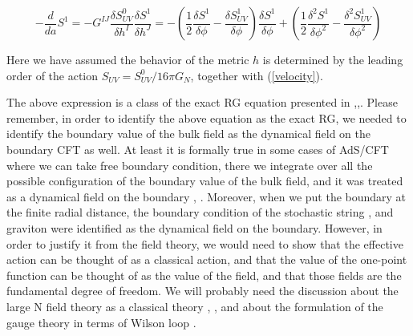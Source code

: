 \documentclass[12pt,epsbox]{article}
\numberwithin{equation}{section}
\begin{document}
\begin{equation}
-\frac{d}{da} S^1 = - G^{IJ} \frac{\delta S^0_{UV}}{\delta h^I} \frac{\delta S^1}{\delta h^J}
=-\left( \frac{1}{2} \frac{\delta S^1}{\delta \phi} -\frac{\delta S^1_{UV}}{\delta \phi}  \right) \frac{\delta S^1}{\delta \phi}
 + \left( \frac{1}{2} \frac{\delta^2 S^1}{\delta \phi^2} -\frac{\delta^2 S^1_{UV} }{\delta \phi^2} \right)\label{HERG1}
\end{equation}

Here we have assumed the behavior of the metric $h$ is determined by the leading order of the action $S_{UV}=S^0_{UV} / 16\pi G_N$, together with (\ref{velocity}).

The above expression is a class of the exact RG equation presented in \cite{Morris},\cite{Morris2},\cite{Oliver}. Please remember, in order to identify the above equation as the exact RG, we needed to identify the boundary value of the bulk field as the dynamical field on the boundary CFT as well. At least it is formally true in some cases of AdS/CFT where we can take free boundary condition, there we integrate over all the possible configuration of the boundary value of the bulk field, and it was treated as a dynamical field on the boundary \cite{MukundHRG}, \cite{WittenNeumann}. Moreover, when we put the boundary at the finite radial distance, the boundary condition of the stochastic string \cite{StochasticSon}, \cite{StochasticdeBoer} and graviton \cite{VV} were identified as the dynamical field on the boundary. However, in order to justify it from the field theory, we would need to show that the effective action can be thought of as a classical action, and that the value of the one-point function can be thought of as the value of the field, and that those fields are the fundamental degree of freedom. We will probably need the discussion about the large N field theory as a classical theory \cite{Yaffe}, \cite{Barbon}, and about the formulation of the gauge theory in terms of Wilson loop \cite{largeN}.
\end{document}
